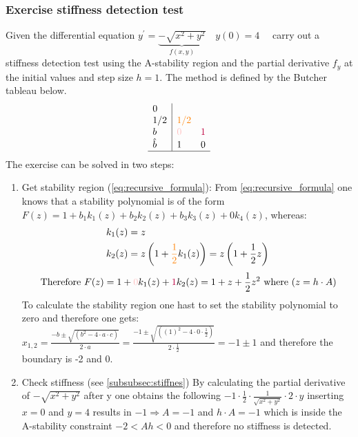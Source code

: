 \subsubsection{Exercise stiffness detection test}
Given the differential equation $y^{\prime}=\underbrace{-\sqrt{x^2+y^2}}_{f(x, y)} \quad y(0)=4 \quad$ carry out a stiffness detection test using the A-stability region and the partial derivative $f_y$ at the initial values and step size $h=1$. The method is defined by the Butcher tableau below.
$$
\begin{array}{l|ll}
0 & & \\
1 / 2 & \textcolor{orange}{1 / 2} & \\
b & \textcolor{pink}{0} & \textcolor{purple}{1} \\
\hat{b} & 1 & 0 \\
\hline
\end{array}
$$
The exercise can be solved in two steps:
\begin{enumerate}
    \item Get stability region (\autoref{eq:recursive_formula}):\newline
    From \autoref{eq:recursive_formula} one knows that a stability polynomial is of the form $F(z)=1+b_1 k_1(z)+b_2 k_2(z)+b_3 k_3(z)+0 k_4(z)$, whereas:
    $$
    \begin{aligned}
    & k_1(z)=z \\
    & k_2(z)=z\left(1+\textcolor{orange}{\frac{1}{2}} k_1(z)\right)=z\left(1+\frac{1}{2} z\right) \\
    \end{aligned}
    $$
    $$
    \text { Therefore } F(z)=1+\textcolor{pink}{0} k_1(z)+\textcolor{purple}{1} k_2(z)=1+z+\frac{1}{2} z^2 \text{ where } (z=h\cdot A)
    $$
    To calculate the stability region one hast to set the stability polynomial to zero and therefore one gets: $x_{1,2}=\frac{-b \pm \sqrt{(b^2-4\cdot a \cdot c)}}{2 \cdot a}=\frac{-1 \pm \sqrt{((1)^2-4\cdot 0 \cdot \frac{1}{2})}}{2 \cdot \frac{1}{2}}=-1 \pm 1$ and therefore the boundary is -2 and 0.
    \item Check stiffness (see \autoref{subsubsec:stiffnes})\newline
     By calculating the partial derivative of $-\sqrt{x^2+y^2}$ after y one obtains the following $-1\cdot \frac{1}{2}\cdot \frac{1}{\sqrt{x^2+y^2}} \cdot 2 \cdot y$ inserting $x=0$ and $y=4$ results in  $-1\Rightarrow A=-1$ and $h\cdot A =-1$ which is inside the A-stability constraint $-2<Ah<0$ and therefore no stiffness is detected.
\end{enumerate}

